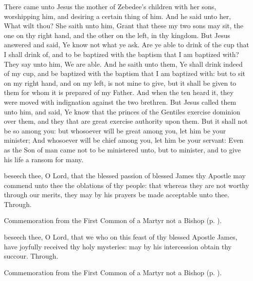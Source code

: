  There came unto Jesus the mother of Zebedee's children with her sons, worshipping him, and desiring a certain thing of him. And he said unto her, What wilt thou? She saith unto him, Grant that these my two sons may sit, the one on thy right hand, and the other on the left, in thy kingdom. But Jesus answered and said, Ye know not what ye ask. Are ye able to drink of the cup that I shall drink of, and to be baptized with the baptism that I am baptized with? They say unto him, We are able. And he saith unto them, Ye shall drink indeed of my cup, and be baptized with the baptism that I am baptized with: but to sit on my right hand, and on my left, is not mine to give, but it shall be given to them for whom it is prepared of my Father. And when the ten heard it, they were moved with indignation against the two brethren. But Jesus called them unto him, and said, Ye know that the princes of the Gentiles exercise dominion over them, and they that are great exercise authority upon them. But it shall not be so among you: but whosoever will be great among you, let him be your minister; And whosoever will be chief among you, let him be your servant: Even as the Son of man came not to be ministered unto, but to minister, and to give his life a ransom for many.


\secret
{} beseech thee, O Lord, that the blessed passion of blessed James thy Apostle may commend unto thee the oblations of thy people: that whereas they are not worthy through our merits, they may by his prayers be made acceptable unto thee. Through.
\begin{rubric}
	 Commemoration  from the First Common of a Martyr not a Bishop (p. \pageref{CommonMartyrNotBishopISecret}).
\end{rubric}


\postcommunion
{} beseech thee, O Lord, that we who on this feast of thy blessed Apostle James, have joyfully received thy holy mysteries: may by his intercession obtain thy succour. Through.
\begin{rubric}
	 Commemoration  from the First Common of a Martyr not a Bishop (p. \pageref{CommonMartyrNotBishopIPostcommunion}).
\end{rubric}



